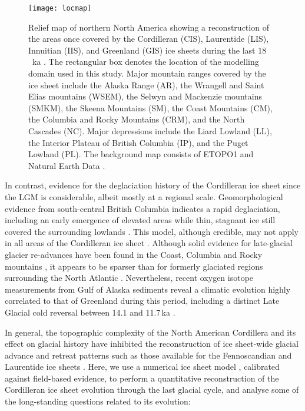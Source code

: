 \documentclass[tc, manuscript]{copernicus}
\begin{document}
\begin{figure}
  \texttt{[image: locmap]}
  \caption{Relief map of northern North America showing a reconstruction of the
           areas once covered by the Cordilleran (CIS), Laurentide (LIS),
           Innuitian (IIS), and Greenland (GIS) ice sheets during the last
           18\,\unit{\,ka} \citep[21.4\,cal\,ka,][]{Dyke.2004}.
           The rectangular box denotes the location of the
           modelling domain used in this study. Major mountain ranges covered
           by the ice sheet include the Alaska Range (AR), the Wrangell and
           Saint Elias mountains (WSEM), the Selwyn and Mackenzie mountains
           (SMKM), the Skeena Mountains (SM), the Coast Mountains (CM), the
           Columbia and Rocky
           Mountains (CRM), and the North Cascades (NC). Major depressions
           include the Liard Lowland (LL), the Interior Plateau of British
           Columbia (IP), and the Puget Lowland (PL). The background
           map consists of ETOPO1 \citep{Amante.Eakins.2009} and Natural Earth
           Data \citep{Patterson.Kelso.2015}.}
  \label{fig:locmap}
\end{figure}

In contrast, evidence for the deglaciation history of the Cordilleran
ice sheet since the LGM is considerable, albeit mostly at a regional scale.
Geomorphological evidence from south-central British Columbia indicates a rapid
deglaciation, including an early emergence of elevated areas while thin,
stagnant ice still covered the surrounding lowlands
    \citep{Fulton.1967, Fulton.1991, Margold.etal.2011, Margold.etal.2013a}.
This model, although credible, may not apply in all areas of the Cordilleran
ice sheet
    \citep{Margold.etal.2013}.
Although solid evidence for late-glacial glacier re-advances have been found in
the Coast, Columbia and Rocky mountains
    \citep{Clague.etal.1997, Friele.Clague.2002, Friele.Clague.2002a,
           Kovanen.2002, Kovanen.Easterbrook.2002, Lakeman.etal.2008,
           Menounos.etal.2008},
it appears to be sparser than for formerly glaciated regions surrounding
the North Atlantic
    \citep[e.g.,][]{Sissons.1979, Lundqvist.1987,
                    Ivy-Ochs.etal.1999, Stea.etal.2011}.
Nevertheless, recent oxygen isotope measurements from Gulf of Alaska sediments
reveal a climatic evolution highly correlated to that of Greenland during this
period, including a distinct Late Glacial cold reversal between 14.1 and
11.7\,ka \citep{Praetorius.Mix.2014}.

In general, the topographic complexity of the North American Cordillera and its
effect on glacial history have inhibited the reconstruction of ice sheet-wide
glacial advance and retreat patterns such as
those available for the Fennoscandian and Laurentide ice sheets
     \citep{Boulton.etal.2001, Dyke.Prest.1987, Dyke.etal.2003,
            Kleman.etal.1997, Kleman.etal.2010, Stroeven.etal.inreview}.
Here, we use a numerical ice sheet model \citep{PISM-authors.2015},
calibrated against field-based evidence, to perform a quantitative
reconstruction of the Cordilleran ice sheet evolution through the last glacial
cycle, and
analyse some of the long-standing questions related to its evolution:
\end{document}

